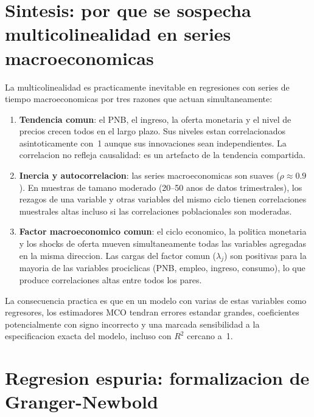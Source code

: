 \documentclass[12pt, letterpaper]{article}
\theoremstyle{remark}
\begin{document}
\section{Sintesis: por que se sospecha multicolinealidad en series macroeconomicas}

\begin{clave}
  La multicolinealidad es practicamente inevitable en regresiones con series
  de tiempo macroeconomicas por tres razones que actuan simultaneamente:

  \begin{enumerate}[leftmargin=1.4em, itemsep=5pt]
    \item \textbf{Tendencia comun}: el PNB, el ingreso, la oferta monetaria
      y el nivel de precios crecen todos en el largo plazo. Sus niveles estan
      correlacionados asintoticamente con~1 aunque sus innovaciones sean
      independientes. La correlacion no refleja causalidad: es un artefacto
      de la tendencia compartida.

    \item \textbf{Inercia y autocorrelacion}: las series macroeconomicas son
      suaves ($\rho \approx 0.9$). En muestras de tamano moderado (20--50
      anos de datos trimestrales), los rezagos de una variable y otras
      variables del mismo ciclo tienen correlaciones muestrales altas incluso
      si las correlaciones poblacionales son moderadas.

    \item \textbf{Factor macroeconomico comun}: el ciclo economico, la
      politica monetaria y los shocks de oferta mueven simultaneamente todas
      las variables agregadas en la misma direccion. Las cargas del factor
      comun ($\lambda_j$) son positivas para la mayoria de las variables
      prociclicas (PNB, empleo, ingreso, consumo), lo que produce correlaciones
      altas entre todos los pares.
  \end{enumerate}

  La consecuencia practica es que en un modelo con varias de estas variables
  como regresores, los estimadores MCO tendran errores estandar grandes,
  coeficientes potencialmente con signo incorrecto y una marcada sensibilidad
  a la especificacion exacta del modelo, incluso con $R^2$ cercano a~1.
\end{clave}

\appendix

\section{Regresion espuria: formalizacion de Granger-Newbold}
\end{document}

